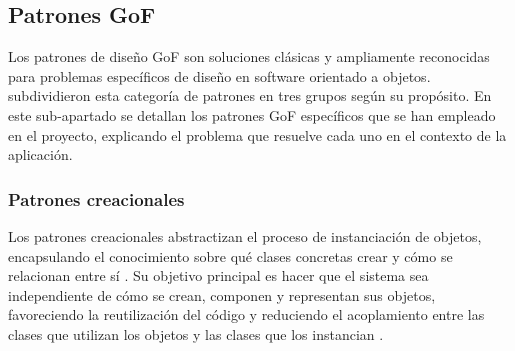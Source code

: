 \subsection{Patrones \ac{GoF}}

Los patrones de diseño \ac{GoF}  son soluciones clásicas y ampliamente reconocidas para problemas 
específicos de diseño en software orientado a objetos. \cite{gamma1995design} subdividieron
esta categoría de patrones en tres grupos según su propósito. En este sub-apartado se detallan 
los patrones \ac{GoF} específicos que se han empleado en el proyecto, explicando el problema que
resuelve cada uno en el contexto de la aplicación.

\subsubsection{Patrones creacionales}

Los patrones creacionales abstractizan el proceso de instanciación de objetos, 
encapsulando el conocimiento sobre qué clases concretas crear y cómo se relacionan entre sí 
\citep{gamma1995design}. Su objetivo principal es hacer que el sistema sea independiente de 
cómo se crean, componen y representan sus objetos, favoreciendo la reutilización del código y 
reduciendo el acoplamiento entre las clases que utilizan los objetos y las clases que los 
instancian \citep{seguridad2022patrones}.

